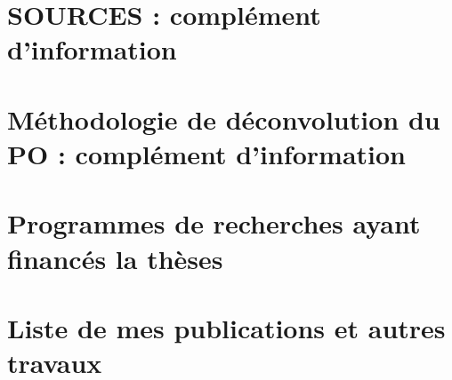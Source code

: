 \documentclass[a4paper,11pt]{book}
\begin{document}
\section{SOURCES : complément d'information}
\label{annexe:SOURCES_SI}


\section{Méthodologie de déconvolution du PO : complément d'information}
\label{annexe:deconvol_OP_SI}


\section{Programmes de recherches ayant financés la thèses}%
\label{annexe:programmes_ayant_financés_la_thèses}

\clearpage

\section{Liste de mes publications et autres travaux}
\label{annexe:CV}
% 



\end{document}
